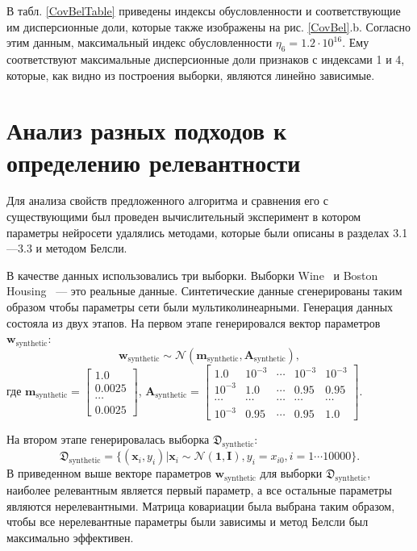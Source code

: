 В табл. \ref{CovBelTable} приведены индексы обусловленности и соответствующие им дисперсионные доли, которые также изображены на рис. \ref{CovBel}.b. Согласно этим данным, максимальный индекс обусловленности $\eta_6 = 1.2\cdot 10^{16}$. Ему соответствуют максимальные дисперсионные доли признаков с индексами 1 и 4, которые, как видно из построения выборки, являются линейно зависимые.

\section{Анализ разных подходов к определению релевантности}
Для анализа свойств предложенного алгоритма и сравнения его с существующими был проведен вычислительный эксперимент в котором параметры нейросети удалялись методами,  которые были описаны в разделах 3.1---3.3 и методом Белсли.

В качестве данных использовались три выборки. Выборки Wine~\cite{Wine} и Boston Housing~\cite{Boston}  --- это реальные данные. Синтетические данные сгенерированы таким образом чтобы параметры сети были мультиколинеарными. Генерация данных состояла из двух этапов. 
На первом этапе генерировался вектор параметров $\mathbf{w}_{\text{synthetic}}$:
\[
\mathbf{w}_{\text{synthetic}}  \sim \mathcal{N}(\textbf{m}_{\text{synthetic}}, \textbf{A}_{\text{synthetic}}),
\]
где 
$\textbf{m}_{\text{synthetic}} = \begin{bmatrix}
1.0\\
0.0025\\
\cdots\\
0.0025
\end{bmatrix}$,
$\textbf{A}_{\text{synthetic}} = \begin{bmatrix}
1.0& 10^{-3}& \cdots& 10^{-3}& 10^{-3}\\
10^{-3}& 1.0& \cdots& 0.95& 0.95\\
\cdots&\cdots&\cdots&\cdots&\cdots\\
10^{-3}& 0.95& \cdots& 0.95& 1.0
\end{bmatrix}$.

На втором этапе генерировалась выборка $\mathfrak{D}_{\text{synthetic}}$:
\[
\mathfrak{D}_{\text{synthetic}} = \{(\textbf{x}_i,y_i)| \textbf{x}_i \sim  \mathcal{N}(\textbf{1}, \textbf{I}), y_i = x_{i0}, i = 1 \cdots 10000\}.
\]
В приведенном выше векторе параметров $\mathbf{w}_{\text{synthetic}}$ для выборки $\mathfrak{D}_{\text{synthetic}}$, наиболее релевантным является первый параметр, а все остальные параметры являются нерелевантными. Матрица ковариации была выбрана таким образом, чтобы все нерелевантные параметры были зависимы и метод Белсли был максимально эффективен.



